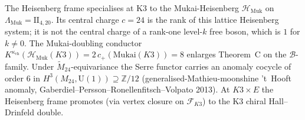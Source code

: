 \begin{remark}
\label{rem:hf-mukai-frame}
The Heisenberg frame specialises at K3 to the Mukai-Heisenberg
$\mathcal{H}_{\mathrm{Muk}}$ on
$\Lambda_{\mathrm{Muk}}=\mathrm{II}_{4,20}$. Its central charge
$c=24$ is the rank of this lattice Heisenberg system; it is not the
central charge of a rank-one level-$k$ free boson, which is
$1$ for $k\neq0$. The Mukai-doubling conductor
$K^{\kappa_{\mathrm{ch}}}(\mathcal{H}_{\mathrm{Muk}}(K3))
= 2\,c_+(\mathrm{Mukai}(K3)) = 8$ enlarges Theorem~C on the
$\mathcal{B}$-family. Under $\widetilde{M}_{24}$-equivariance the
Serre functor carries an anomaly cocycle of order $6$ in
$H^3(M_{24}, \mathrm{U}(1)) \supseteq \mathbb{Z}/12$
(generalised-Mathieu-moonshine 't~Hooft anomaly,
Gaberdiel--Persson--Ronellenfitsch--Volpato 2013). At $K3 \times E$
the Heisenberg frame promotes (via vertex closure on
$\mathcal{F}_{K3}$) to the K3 chiral Hall--Drinfeld double.
\end{remark}
